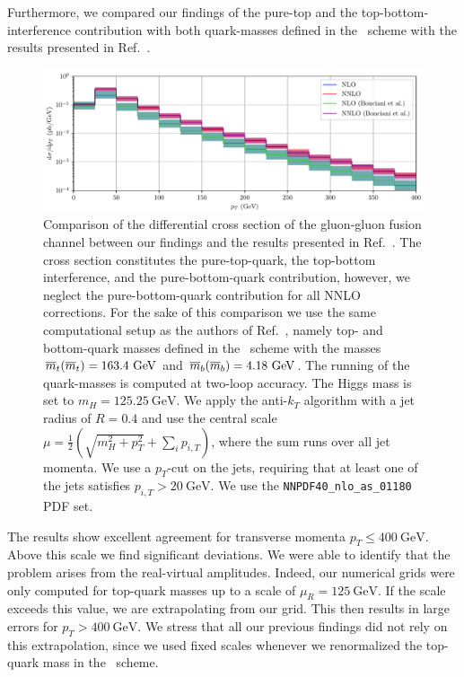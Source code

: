 Furthermore, we compared our findings of the pure-top and the top-bottom-interference contribution with both quark-masses defined in the \MS\ scheme with the results presented in Ref.~\cite{Bonciani:2022jmb}.
\begin{figure}[ht]
\centering
\includegraphics[width=\textwidth]{Images/pTBonciani.pdf}
\caption{Comparison of the differential cross section of the gluon-gluon fusion channel between our findings and the results presented in Ref.~\cite{Bonciani:2022jmb}. The cross section constitutes the pure-top-quark, the top-bottom interference, and the pure-bottom-quark contribution, however, we neglect the pure-bottom-quark contribution for all \acs{NNLO} corrections. For the sake of this comparison we use the same computational setup as the authors of Ref.~\cite{Bonciani:2022jmb}, namely top- and bottom-quark masses defined in the \MS\ scheme with the masses $\msMass{t} = 163.4\ \mathrm{GeV}$ and $\msMass{b} = 4.18\ \mathrm{GeV}$. The running of the quark-masses is computed at two-loop accuracy. The Higgs mass is set to $m_H = 125.25\ \mathrm{GeV}$. We apply the anti-$k_T$ algorithm with a jet radius of $R = 0.4$ and use the central scale $\mu = \frac{1}{2}\left( \sqrt{m_H^2 + p_T^2} + \sum_i p_{i, T} \right)$, where the sum runs over all jet momenta. We use a $p_T$-cut on the jets, requiring that at least one of the jets satisfies $p_{i,T} > 20 \ \mathrm{GeV}$. We use the \texttt{NNPDF40\_nlo\_as\_01180} \acs{PDF} set.}
\label{fig:6:bonciani_comparison}
\end{figure}
The results show excellent agreement for transverse momenta $p_T \le 400 \ \mathrm{GeV}$. Above this scale we find significant deviations. We were able to identify that the problem arises from the real-virtual amplitudes. Indeed, our numerical grids were only computed for top-quark masses up to a scale of $\mu_R = 125\ \mathrm{GeV}$. If the scale exceeds this value, we are extrapolating from our grid. This then results in large errors for $p_T > 400 \ \mathrm{GeV}$. We stress that all our previous findings did not rely on this extrapolation, since we used fixed scales whenever we renormalized the top-quark mass in the \MS\ scheme.

